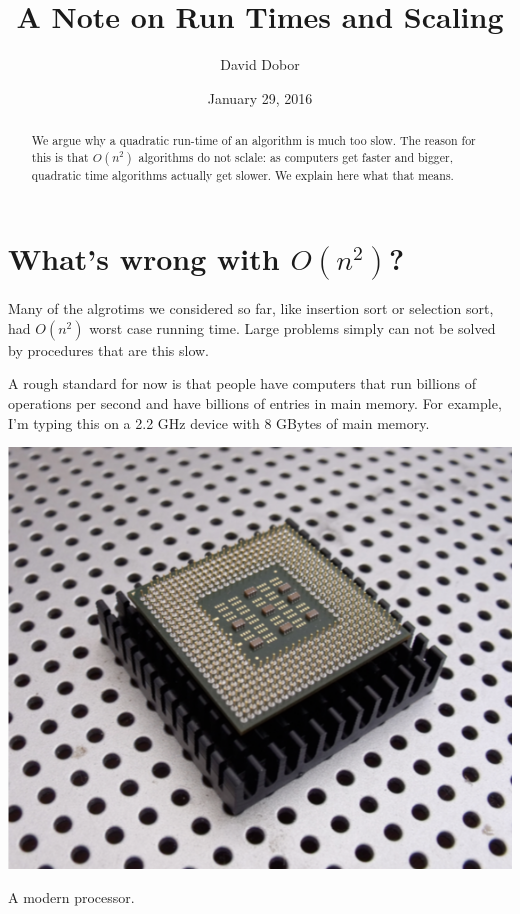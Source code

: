 \documentclass{tufte-handout}
\title{A Note on Run Times and Scaling}
\author{David Dobor}
\date{January 29, 2016} %
\begin{document}
\maketitle%

\begin{abstract}
\noindent We argue why a quadratic run-time of an algorithm is much too slow. The reason for this is that 
$O(n^2)$ algorithms do not sclale: as computers get faster and bigger, quadratic time
algorithms actually get slower. We explain here what that means.
\end{abstract}


\section{What's wrong with $O(n^2)$?}

Many of the algrotims we considered so far, like insertion sort or selection sort, had $O(n^2)$ 
worst case running time. Large problems simply can not be solved by procedures
that are this slow.

\bigskip
A rough standard for now is that people have computers that run billions of operations per second and 
have billions of entries in main memory.  For example, I'm typing this on a 2.2 GHz device with 8 GBytes
of main memory.  

\begin{marginfigure}
  \includegraphics{processor}
  \caption{A modern processor.}
\end{marginfigure}
\end{document}
